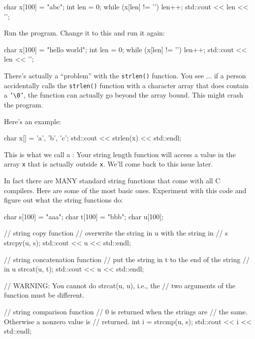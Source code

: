 \begin{consolethree}[escapeinside=||]
char x[100] = "abc";
int len = 0;
while (x[len] != '\0')
{
    len++;
}
std::cout << len << '\n';
\end{consolethree}

Run the program. Change it to this and run it again:

\begin{consolethree}[escapeinside=||]
char x[100] = "hello world";
int len = 0;
while (x[len] != '\0')
{
    len++;
}
std::cout << len << '\n';
\end{consolethree}

There's actually a ``problem'' with the \texttt{strlen()} function. You see ... if a person accidentally calls the \texttt{strlen()} function with a character array that does  contain a \texttt{'\textbackslash 0'}, the function can actually go beyond the array bound. This might crash the program.

Here's an example:

\begin{consolethree}[escapeinside=||]
char x[] = {'a', 'b', 'c'};
std::cout << strlen(x) << std::endl;
\end{consolethree}

This is what we call a : Your string length function will access a value in the array \texttt{x} that is actually outside \texttt{x}. We'll come back to this issue later.


\newpage{}

In fact there are MANY standard string functions that come with all C compilers. Here are some of the most basic ones. Experiment with this code and figure out what the string functions do:

\begin{consolethree}[escapeinside=||]
char s[100] = "aaa";
char t[100] = "bbb";
char u[100];

// string copy function
// overwrite the string in u with the string in
// s
strcpy(u, s);
std::cout << u << std::endl;

// string concatenation function
// put the string in t to the end of the string
// in u
strcat(u, t);
std::cout << u << std::endl;

// WARNING: You cannot do strcat(u, u), i.e., the
// two arguments of the function must be different.

// string comparison function
// 0 is returned when the strings are
// the same. Otherwise a nonzero value is
// returned.
int i = strcmp(u, s);
std::cout << i << std::endl;
\end{consolethree}

